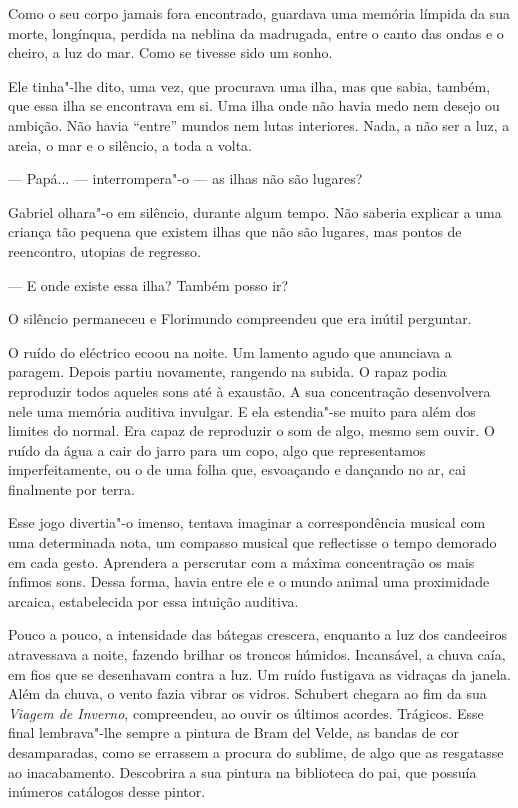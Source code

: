 Como o seu corpo jamais fora encontrado, guardava uma memória límpida da
sua morte, longínqua, perdida na neblina da madrugada, entre o canto das
ondas e o cheiro, a luz do mar. Como se tivesse sido um sonho.

Ele tinha"-lhe dito, uma vez, que procurava uma ilha, mas que sabia,
também, que essa ilha se encontrava em si. Uma ilha onde não havia medo
nem desejo ou ambição. Não havia ``entre'' mundos nem lutas interiores.
Nada, a não ser a luz, a areia, o mar e o silêncio, a toda a volta.

--- Papá... --- interrompera"-o --- as ilhas não são lugares?

Gabriel olhara"-o em silêncio, durante algum tempo. Não saberia explicar
a uma criança tão pequena que existem ilhas que não são lugares, mas
pontos de reencontro, utopias de regresso.

--- E onde existe essa ilha? Também posso ir?

O silêncio permaneceu e Florimundo compreendeu que era inútil perguntar.

O ruído do eléctrico ecoou na noite. Um lamento agudo que anunciava a
paragem. Depois partiu novamente, rangendo na subida. O rapaz podia
reproduzir todos aqueles sons até à exaustão. A sua concentração
desenvolvera nele uma memória auditiva invulgar. E ela estendia"-se muito
para além dos limites do normal. Era capaz de reproduzir o som de algo,
mesmo sem ouvir. O ruído da água a cair do jarro para um copo, algo que
representamos imperfeitamente, ou o de uma folha que, esvoaçando e
dançando no ar, cai finalmente por terra.

Esse jogo divertia"-o imenso, tentava imaginar a correspondência musical
com uma determinada nota, um compasso musical que reflectisse o tempo
demorado em cada gesto. Aprendera a perscrutar com a máxima concentração
os mais ínfimos sons. Dessa forma, havia entre ele e o mundo animal uma
proximidade arcaica, estabelecida por essa intuição auditiva.

Pouco a pouco, a intensidade das bátegas crescera, enquanto a luz dos
candeeiros atravessava a noite, fazendo brilhar os troncos húmidos.
Incansável, a chuva caía, em fios que se desenhavam contra a luz. Um
ruído fustigava as vidraças da janela. Além da chuva, o vento fazia
vibrar os vidros. Schubert chegara ao fim da sua \emph{Viagem de
Inverno}, compreendeu, ao ouvir os últimos acordes. Trágicos. Esse final
lembrava"-lhe sempre a pintura de Bram del Velde, as bandas de cor
desamparadas, como se errassem a procura do sublime, de algo que as
resgatasse ao inacabamento. Descobrira a sua pintura na biblioteca do
pai, que possuía inúmeros catálogos desse pintor.

